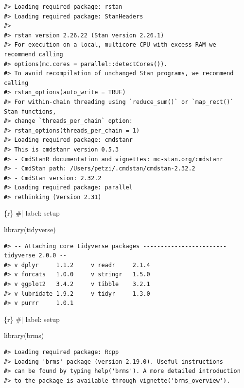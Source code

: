 \documentclass[
  letterpaper,
  DIV=11,
  numbers=noendperiod]{scrreprt}
\newenvironment{Shaded}{\begin{snugshade}}{\end{snugshade}}
\newcommand{\CommentTok}[1]{\textcolor[rgb]{0.37,0.37,0.37}{#1}}
\newcommand{\FunctionTok}[1]{\textcolor[rgb]{0.28,0.35,0.67}{#1}}
\newcommand{\InformationTok}[1]{\textcolor[rgb]{0.37,0.37,0.37}{#1}}
\newcommand{\NormalTok}[1]{\textcolor[rgb]{0.00,0.23,0.31}{#1}}
\begin{document}
\begin{verbatim}
#> Loading required package: rstan
#> Loading required package: StanHeaders
#> 
#> rstan version 2.26.22 (Stan version 2.26.1)
#> For execution on a local, multicore CPU with excess RAM we recommend calling
#> options(mc.cores = parallel::detectCores()).
#> To avoid recompilation of unchanged Stan programs, we recommend calling
#> rstan_options(auto_write = TRUE)
#> For within-chain threading using `reduce_sum()` or `map_rect()` Stan functions,
#> change `threads_per_chain` option:
#> rstan_options(threads_per_chain = 1)
#> Loading required package: cmdstanr
#> This is cmdstanr version 0.5.3
#> - CmdStanR documentation and vignettes: mc-stan.org/cmdstanr
#> - CmdStan path: /Users/petzi/.cmdstan/cmdstan-2.32.2
#> - CmdStan version: 2.32.2
#> Loading required package: parallel
#> rethinking (Version 2.31)
\end{verbatim}

\begin{Shaded}
\begin{Highlighting}[]
\InformationTok{\textasciigrave{}\textasciigrave{}\textasciigrave{}\{r\}}
\CommentTok{\#| label: setup}

\FunctionTok{library}\NormalTok{(tidyverse)}
\InformationTok{\textasciigrave{}\textasciigrave{}\textasciigrave{}}
\end{Highlighting}
\end{Shaded}

\begin{verbatim}
#> -- Attaching core tidyverse packages ------------------------ tidyverse 2.0.0 --
#> v dplyr     1.1.2     v readr     2.1.4
#> v forcats   1.0.0     v stringr   1.5.0
#> v ggplot2   3.4.2     v tibble    3.2.1
#> v lubridate 1.9.2     v tidyr     1.3.0
#> v purrr     1.0.1
\end{verbatim}

\begin{Shaded}
\begin{Highlighting}[]
\InformationTok{\textasciigrave{}\textasciigrave{}\textasciigrave{}\{r\}}
\CommentTok{\#| label: setup}

\FunctionTok{library}\NormalTok{(brms)}
\InformationTok{\textasciigrave{}\textasciigrave{}\textasciigrave{}}
\end{Highlighting}
\end{Shaded}

\begin{verbatim}
#> Loading required package: Rcpp
#> Loading 'brms' package (version 2.19.0). Useful instructions
#> can be found by typing help('brms'). A more detailed introduction
#> to the package is available through vignette('brms_overview').
\end{verbatim}
\end{document}
